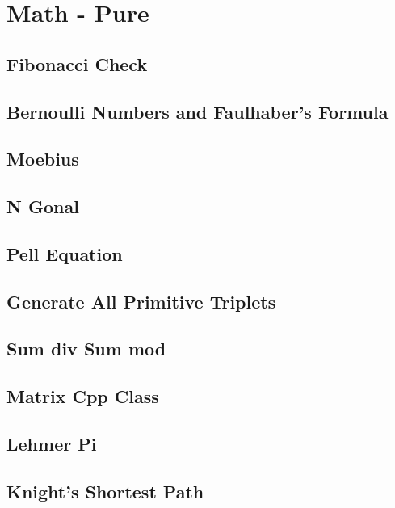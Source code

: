 \section{Math - Pure}
\subsection{Fibonacci Check}
\raggedbottom
\hrulefill
\subsection{Bernoulli Numbers and Faulhaber's Formula}
\raggedbottom
\hrulefill
\subsection{Moebius}
\raggedbottom
\hrulefill
\subsection{N Gonal}
\raggedbottom
\hrulefill
\subsection{Pell Equation}
\raggedbottom
\hrulefill
\subsection{Generate All Primitive Triplets}
\raggedbottom
\hrulefill
\subsection{Sum div Sum mod}
\raggedbottom
\hrulefill
\subsection{Matrix Cpp Class}
\raggedbottom
\hrulefill
\subsection{Lehmer Pi}
\raggedbottom
\hrulefill
\subsection{Knight's Shortest Path}
\raggedbottom
\hrulefill

